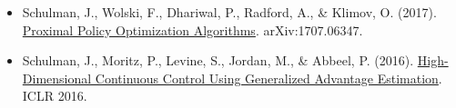\vspace{0.25em}
\begin{itemize}
\tightlist
\item
  Schulman, J., Wolski, F., Dhariwal, P., Radford, A., \& Klimov, O. (2017). \href{https://arxiv.org/abs/1707.06347}{Proximal Policy Optimization Algorithms}. arXiv:1707.06347.
\item
  Schulman, J., Moritz, P., Levine, S., Jordan, M., \& Abbeel, P. (2016). \href{https://arxiv.org/abs/1506.02438}{High-Dimensional Continuous Control Using Generalized Advantage Estimation}. ICLR 2016.
\end{itemize}

\clearpage
